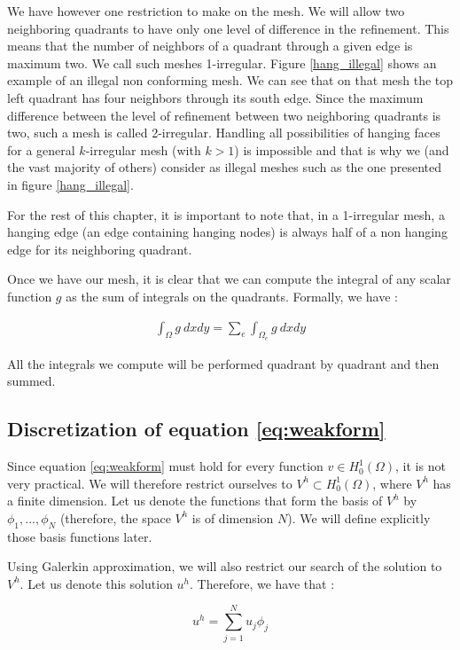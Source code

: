 We have however one restriction to make on the mesh. We will allow two neighboring quadrants to have only one level of difference in the refinement. This means that the number of neighbors of a quadrant through a given edge is maximum two. We call such meshes 1-irregular. Figure \ref{hang_illegal} shows an example of an illegal non conforming mesh. We can see that on that mesh the top left quadrant has four neighbors through its south edge. Since the maximum difference between the level of refinement between two neighboring quadrants is two, such a mesh is called 2-irregular.  Handling all possibilities of hanging faces for a general $k$-irregular mesh (with $k>1$) is impossible and that is why we (and the vast majority of others) consider as illegal meshes such as the one presented in figure \ref{hang_illegal}.

For the rest of this chapter, it is important to note that, in a 1-irregular mesh, a hanging edge (an edge containing hanging nodes) is always half of a non hanging edge for its neighboring quadrant.

Once we have our mesh, it is clear that we can compute the integral of any scalar function $g$ as the sum of integrals on the quadrants. Formally, we have :  

\begin{align}
\int_\Omega g\:dxdy = \sum_e \int_{\Omega_e} g\:dxdy \label{eq:int}
\end{align}

All the integrals we compute will be performed quadrant by quadrant and then summed. 

\subsection{Discretization of equation \ref{eq:weakform}}

Since equation \ref{eq:weakform} must hold for every function $v \in H_0^1(\Omega)$, it is not very practical. We will therefore restrict ourselves to $V^h \subset H_0^1(\Omega)$, where $V^h$ has a finite dimension. Let us denote the functions that form the basis of $V^h$ by $\phi_1,..., \phi_N$ (therefore, the space $V^h$ is of dimension $N$). We will define explicitly those basis functions later. 

Using Galerkin approximation, we will also restrict our search of the solution to $V^h$. Let us denote this solution $u^h$. Therefore, we have that : 

$$u^h = \sum_{j=1}^N u_j \phi_j $$

